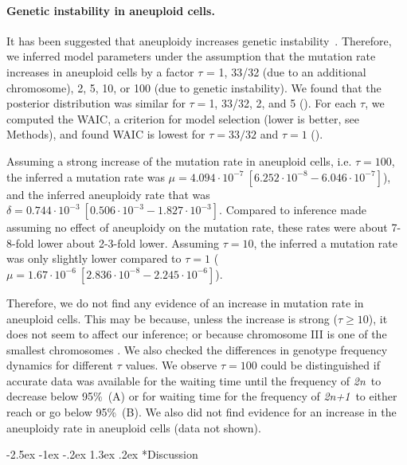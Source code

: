 \documentclass[12pt]{extarticle}
\makeatletter
\renewcommand\section{\@startsection {section}{1}{\z@}%
     {-2.5ex \@plus -1ex \@minus -.2ex}%
     {1.3ex \@plus.2ex}%
    {\Large\bfseries}}
\newcommand{\euwt}{\emph{2n}}
\newcommand{\anwt}{\emph{2n+1}}
\makeatother
\begin{document}
\paragraph{Genetic instability in aneuploid cells.}
It has been suggested that aneuploidy increases genetic instability~\citep{Sheltzer2011b, Ippolito2021b}.
Therefore, we inferred model parameters under the assumption that the mutation rate increases in aneuploid cells by a factor $\tau$ = 1, 33/32 (due to an additional chromosome), 2, 5, 10, or 100 (due to genetic instability).
We found that the posterior distribution was similar for $\tau=$1, 33/32, 2, and 5 ().
For each $\tau$, we computed the WAIC, a criterion for model selection (lower is better, see Methods), and found WAIC is lowest for $\tau=33/32$ and $\tau=1$ ().

Assuming a strong increase of the mutation rate in aneuploid cells, i.e. $\tau=100$, the inferred a mutation rate was $\mu=4.094\cdot10^{-7}\ [6.252\cdot10^{-8}-6.046\cdot10^{-7}]$), and the inferred aneuploidy rate that was  $\delta=0.744\cdot10^{-3}\ [0.506\cdot10^{-3}-1.827\cdot10^{-3}]$. 
Compared to inference made assuming no effect of aneuploidy on the mutation rate, these rates were about 7-8-fold lower about 2-3-fold lower.
Assuming $\tau=10$, the inferred a mutation rate was only slightly lower compared to $\tau=1$ ($\mu=1.67\cdot10^{-6}\ [2.836\cdot10^{-8}-2.245\cdot10^{-6}]$). 

Therefore, we do not find any evidence of an increase in mutation rate in aneuploid cells. This may be because, unless the increase is strong ($\tau \ge 10$), it does not seem to affect our inference; or because chromosome III is one of the smallest chromosomes \citep{Gilchrist2019}.
We also checked the differences in genotype frequency dynamics for different $\tau$ values. We observe $\tau=100$ could be distinguished if accurate data was available for the waiting time until the frequency of \euwt\ to decrease below 95\%~(A) or for waiting time for the frequency of \anwt\ to either reach or go below 95\%~(B).
We also did not find evidence for an increase in the aneuploidy rate in aneuploid cells (data not shown).


\section*{Discussion}
\end{document}

